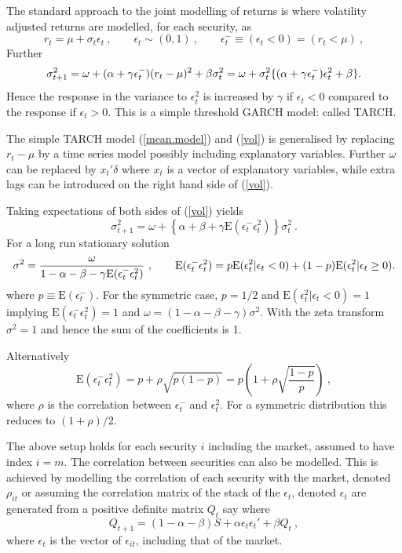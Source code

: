 \documentclass[authoryear]{elsarticle}
\newcommand{\E}{\mathrm{E}}
\newcommand{\eps}{\epsilon}
\newcommand{\eref}[1]{(\ref{#1})}
\newcommand{\cq}{\ , \qquad}
\newcommand{\be}[1]{\begin{equation}\label{#1}}
\newcommand{\ee}{\end{equation}}
\begin{document}
The standard approach to the joint modelling of returns is where volatility adjusted returns are modelled, for each security, as
\newcommand{\vareps}{\varepsilon}
\be{mean.model}
r_{t}=\mu+\sigma_t\eps_t\cq \eps_t\sim (0,1)\cq  \eps^-_t\equiv(\eps_t<0)=(r_t<\mu)\ ,
\ee
Further
\be{vol}
\sigma_{t+1}^2 = \omega+ (\alpha+\gamma\eps^-_t) (r_t-\mu)^2 + \beta\sigma^2_t=\omega+ \sigma^2_t\{(\alpha+\gamma \eps^-_t)\eps_{t}^2 + \beta\}\\ .
\ee
Hence the response in the variance to $\eps_t^2$  is increased by $\gamma$   if $\eps_{t}<0$ compared to the response if $\eps_t>0$.  This is a simple threshold GARCH model:  called TARCH.   

The simple TARCH model \eref{mean.model} and \eref{vol} is generalised by replacing $r_t-\mu$ by a time series model possibly including explanatory variables.   Further $\omega$ can be replaced by $x_t'\delta$ where $x_t$ is a vector of explanatory variables, while extra lags can be introduced on the right hand side of \eref{vol}.  

 Taking expectations of both sides of \eref{vol} yields
 $$
\sigma_{t+1}^2 = \omega+ \left\{\alpha+\beta+\gamma \E(\eps^-_t\eps_{t}^2)\right\}\sigma_t^2\ .
 $$
For a long run stationary solution 
$$
\sigma^2 = \frac{\omega }{1-\alpha-\beta-\gamma\E(\eps^-_t\eps_t^2)}\cq \E(\eps^-_t\eps_t^2)=p\E(\eps_t^2|\eps_t<0)+(1-p)\E(\eps_t^2|\eps_t\ge 0)\\ .
$$
where $p\equiv\E(\eps_t^-)$.  For the symmetric case, $p=1/2$ and  $\E(\eps_t^2|\eps_t<0)=1$ implying $\E(\eps^-_t\eps_t^2)=1$ and
$
\omega=(1-\alpha-\beta-\gamma)\sigma^2
$.  With the zeta transform  $\sigma^2=1$ and hence the sum of the coefficients is 1.

Alternatively
$$
\E(\eps^-_t\eps_t^2) = p +\rho\sqrt{p(1-p)} = p\left(1+\rho\sqrt{\frac{1-p}{p}}\right)\ ,
$$
where $\rho$ is the correlation between $\eps_t^-$ and $\eps_t^2$.   For a symmetric distribution this reduces to $(1+\rho)/2$. 

The above setup holds for each security $i$ including the market, assumed to have index $i=m$.   The correlation between securities can also be modelled.   This is achieved by modelling the correlation of each security with the market, denoted $\rho_{it}$ or assuming the correlation matrix of the stack of the $\eps_t$, denoted $\eps_t$  are generated from a positive definite matrix $Q_t$ say where \citep{engle2002dynamic}
$$
Q_{t+1} = (1-\alpha-\beta) S + \alpha \eps_t\eps_t' + \beta Q_t\ ,
$$
where $\eps_t$ is the vector of $\eps_{it}$, including that of the market.
\end{document}
